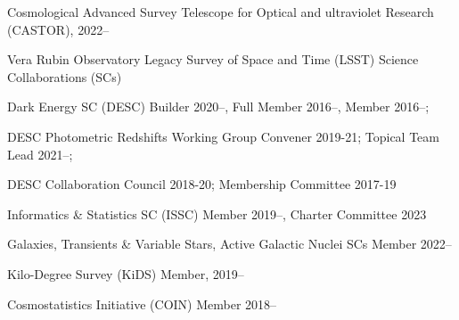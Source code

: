 \documentclass[11pt,letterpaper]{article}
\begin{document}
%

\begin{list}{}{\malzlist}
	\item Cosmological Advanced Survey Telescope for Optical and ultraviolet Research (CASTOR), 2022--
	\item Vera Rubin Observatory Legacy Survey of Space and Time (LSST) Science Collaborations (SCs)
	\begin{list}{}{\malzlist}
		\item Dark Energy SC (DESC) Builder 2020--, Full Member 2016--, Member 2016--;
		\item DESC Photometric Redshifts Working Group Convener 2019-21; Topical Team Lead 2021--;
		\item DESC Collaboration Council 2018-20; Membership Committee 2017-19
		\item Informatics \& Statistics SC (ISSC) Member 2019--, Charter Committee 2023
		\item Galaxies, Transients \& Variable Stars, Active Galactic Nuclei SCs  Member 2022--
	\end{list}
	\item Kilo-Degree Survey (KiDS) Member, 2019--
	\item Cosmostatistics Initiative (COIN) Member 2018--
\end{list}
\end{document}
